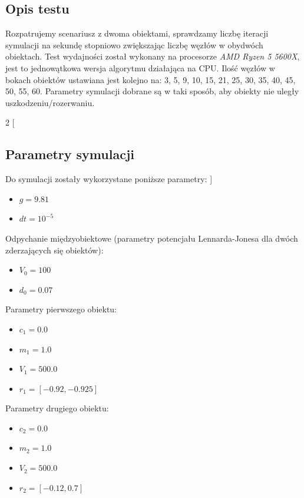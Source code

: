 \documentclass[12pt, letterpaper]{report}
\begin{document}
    \clearpage
    \subsection{Opis testu}
    Rozpatrujemy scenariusz z dwoma obiektami, sprawdzamy liczbę iteracji symulacji na sekundę stopniowo
    zwiększając liczbę węzłów w obydwóch obiektach.
    Test wydajności został wykonany na procesorze \emph{AMD Ryzen 5 5600X}, 
    jest to jednowątkowa wersja algorytmu działająca na CPU.
    Ilość węzłów w bokach obiektów ustawiana jest kolejno na: 
    3, 5, 9, 10, 15, 21, 25, 30, 35, 40, 45, 50, 55, 60. Parametry symulacji dobrane są 
    w taki sposób, aby obiekty nie uległy uszkodzeniu/rozerwaniu.
    

    \begin{multicols}{2}
        [
            \subsection{Parametry symulacji}
            Do symulacji zostały wykorzystane poniższe parametry:
        ]

        \begin{itemize}
            \item $g = 9.81$
            \item $dt = 10^{-5}$
        \end{itemize}
        Odpychanie międzyobiektowe (parametry potencjału Lennarda-Jonesa dla dwóch zderzających się obiektów):
        \begin{itemize}
            \item $V_{0} = 100$
            \item $d_{0} = 0.07$
        \end{itemize}
        Parametry pierwszego obiektu:
        \begin{itemize}
            \item $c_{1} = 0.0$
            \item $m_{1} = 1.0$
            \item $V_{1} = 500.0$
            \item $r_{1} = [-0.92, -0.925]$
        \end{itemize}
        Parametry drugiego obiektu:
        \begin{itemize}
            \item $c_{2} = 0.0$
            \item $m_{2} = 1.0$
            \item $V_{2} = 500.0$
            \item $r_{2} = [-0.12, 0.7]$
        \end{itemize}
    \end{multicols}
\end{document}
